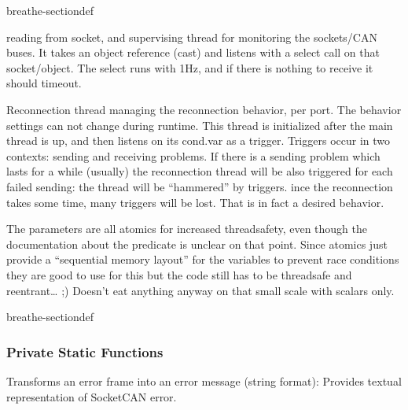 \documentclass[a4paper,10pt,english]{sphinxmanual}
\begin{document}
\begin{fulllineitems}
\begin{sphinxuseclass}{breathe-sectiondef}
\begin{fulllineitems}
\sphinxAtStartPar
reading from socket, and supervising thread for monitoring the sockets/CAN buses. It takes an object reference (cast) and listens with a select call on that socket/object. The select runs with 1Hz, and if there is nothing to receive it should timeout. 

\end{fulllineitems}



\begin{fulllineitems}
%
\pysigstartmultiline
{}%
\pysigstopmultiline
\sphinxAtStartPar
Reconnection thread managing the reconnection behavior, per port. The behavior settings can not change during runtime. This thread is initialized after the main thread is up, and then listens on its cond.var as a trigger. Triggers occur in two contexts: sending and receiving problems. If there is a sending problem which lasts for a while (usually) the reconnection thread will be also triggered for each failed sending: the thread will be “hammered” by triggers. ince the reconnection takes some time, many triggers will be lost. That is in fact a desired behavior.

\sphinxAtStartPar
The parameters are all atomics for increased thread\sphinxhyphen{}safety, even though the documentation about the predicate is unclear on that point. Since atomics just provide a “sequential memory layout” for the variables to prevent race conditions they are good to use for this but the code still has to be threadsafe and reentrant… ;\sphinxhyphen{}) Doesn’t eat anything anyway on that small scale with scalars only.

\sphinxAtStartPar
{} 

\end{fulllineitems}


\end{sphinxuseclass}
\begin{sphinxuseclass}{breathe-sectiondef}\subsubsection*{Private Static Functions}


\begin{fulllineitems}
%
\pysigstartmultiline
{}%
\pysigstopmultiline
\sphinxAtStartPar
Transforms an error frame into an error message (string format): Provides textual representation of SocketCAN error. 

\end{fulllineitems}


\end{sphinxuseclass}
\end{fulllineitems}
\end{document}
